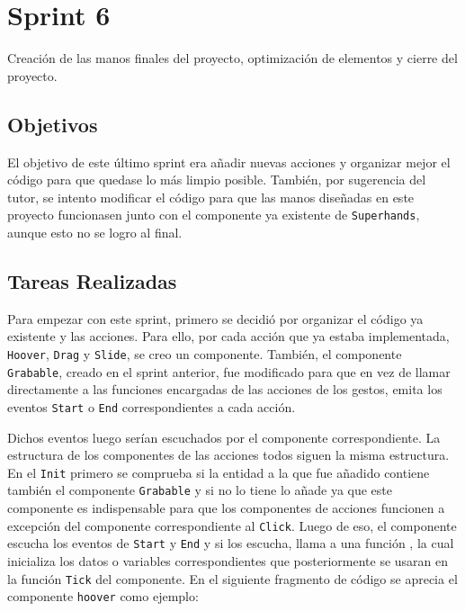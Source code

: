 \documentclass[a4paper, 12pt]{book}
\begin{document}
\section{Sprint 6}
\label{sec:sprint6}
Creación de las manos finales del proyecto, optimización de elementos y cierre del proyecto.

\subsection{Objetivos}
\label{subsec:objetivo-principal6}
El objetivo de este último sprint era añadir nuevas acciones y organizar mejor el código para que quedase lo más limpio posible. 
También, por sugerencia del tutor, se intento modificar el código para que las manos diseñadas en este proyecto funcionasen junto con el componente ya existente de \texttt{Superhands}, aunque esto no se logro al final. 

\subsection{Tareas Realizadas}
\label{subsec:implementacion6}
Para empezar con este sprint, primero se decidió por organizar el código ya existente y las acciones. Para ello, por cada acción que ya estaba implementada, \texttt{Hoover}, \texttt{Drag} y \texttt{Slide}, se creo un componente. También, el componente \texttt{Grabable}, creado en el sprint anterior, fue modificado para que en vez de llamar directamente a las funciones encargadas de las acciones de los gestos, emita los eventos \texttt{Start} o \texttt{End} correspondientes a cada acción. 

Dichos eventos luego serían escuchados por el componente correspondiente. La estructura de los componentes de las acciones todos siguen la misma estructura. En el \texttt{Init} primero se comprueba si la entidad a la que fue añadido contiene también el componente \texttt{Grabable} y si no lo tiene lo añade ya que este componente es indispensable para que los componentes de acciones funcionen a excepción del componente correspondiente al \texttt{Click}. Luego de eso, el componente escucha los eventos de \texttt{Start} y \texttt{End} y si los escucha, llama a una función
, la cual inicializa los datos o variables correspondientes que posteriormente se usaran en la función \texttt{Tick} del componente. En el siguiente fragmento de código se aprecia el componente \texttt{hoover} como ejemplo:
\end{document}
